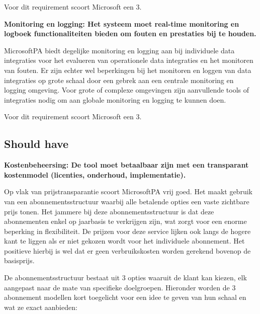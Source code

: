 Voor dit requirement scoort Microsoft een 3.

\vspace{\baselineskip}


\textbf{Monitoring en logging: Het systeem moet real-time monitoring en logboek functionaliteiten bieden om fouten en prestaties bij te houden.}

\vspace{\baselineskip}

MicrosoftPA biedt degelijke monitoring en logging aan bij individuele data integraties voor het evalueren van operationele data integraties en het monitoren van fouten. Er zijn echter wel beperkingen bij het monitoren en loggen van data integraties op grote schaal door een gebrek aan een centrale monitoring en logging omgeving. Voor grote of complexe omgevingen zijn aanvullende tools of integraties nodig om aan globale monitoring en logging te kunnen doen.

Voor dit requirement scoort Microsoft een 3.

\vspace{\baselineskip}

\subsection{Should have}%
\label{ShouldHaveMicrosoft}

\textbf{Kostenbeheersing: De tool moet betaalbaar zijn met een transparant kostenmodel (licenties, onderhoud, implementatie).}

\vspace{\baselineskip}

Op vlak van prijstransparantie scoort MicrosoftPA vrij goed. Het maakt gebruik van een abonnementsstructuur waarbij alle betalende opties een vaste zichtbare prijs tonen. Het jammere bij deze abonnementsstructuur is dat deze abonnementen enkel op jaarbasis te verkrijgen zijn, wat zorgt voor een enorme beperking in flexibiliteit.  De prijzen voor deze service lijken ook langs de hogere kant te liggen als er niet gekozen wordt voor het individuele abonnement. Het positieve hierbij is wel dat er geen verbruikskosten worden gerekend bovenop de basisprijs.

\vspace{\baselineskip}

De abonnementsstructuur bestaat uit 3 opties waaruit de klant kan kiezen, elk aangepast naar de mate van specifieke doelgroepen. Hieronder worden de 3 abonnement modellen kort toegelicht voor een idee te geven van hun schaal en wat ze exact aanbieden:

